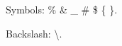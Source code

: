 \documentclass{article}
\begin{document}
Symbols: \% \& \_ \# \$ \{ \}.

Backslash: \textbackslash{}.
\end{document}
